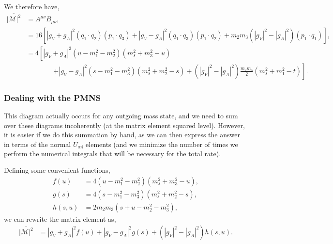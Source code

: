 \documentclass[11pt, a4paper]{article}
\begin{document}
%
We therefore have, 
%
\begin{align*} \overline{\left|\mathcal{M}\right|^2} &= A^{\mu\nu}B_{\mu\nu},\\  
%
&= 16\left[ \left|g_V+g_A\right|^2\left(q_1\cdot q_2\right) \left(p_1\cdot
q_3\right) + \left|g_V-g_A\right|^2\left(q_1\cdot q_3\right) \left(p_1\cdot
q_2\right) + m_2m_3\left(|g_V|^2-|g_A|^2\right)\left(p_1\cdot q_1\right)  \right],\\
%
&=4\left[ \left|g_V+g_A\right|^2 (u - m_1^2 - m_2^2)(m_s^2 + m_3^2 - u)\right.\\
%
&\qquad\qquad \left.+ \left|g_V-g_A\right|^2 (s -m_1^2 - m_3^2)(m_s^2 + m_2^2 - s) + \left(|g_V|^2-|g_A|^2\right)\frac{m_2m_3}{2}\left( m_s^2+m_1^2 - t\right) \right].
%
\end{align*}
%

\subsubsection{Dealing with the PMNS}

This diagram actually occurs for any outgoing mass state, and we need to sum
over these diagrams incoherently (at the matrix element squared level).
However, it is easier if we do this summation by hand, as we can then express
the answer in terms of the normal $U_{\alpha 4}$ elements (and we minimize the 
number of times we perform the numerical integrals that will be necessary for
the total rate).

%
Defining some convenient functions, 
%
\begin{align*}  f(u) &= 4(u - m_1^2 - m_2^2)(m_s^2 + m_3^2 - u),\\  
g(s) &= 4(s -m_1^2 - m_3^2)(m_s^2 + m_2^2 - s),\\
h(s,u) &= 2m_2m_3\left(s + u - m_2^2 - m_3^2\right), \end{align*}
%
we can rewrite the matrix element as,
%
\begin{align*} \overline{\left|\mathcal{M}\right|^2} &=\left|g_V+g_A\right|^2 f(u)
+ \left|g_V-g_A\right|^2g(s) + \left(|g_V|^2-|g_A|^2\right)h(s,u).
%
\end{align*}
%
\end{document}
